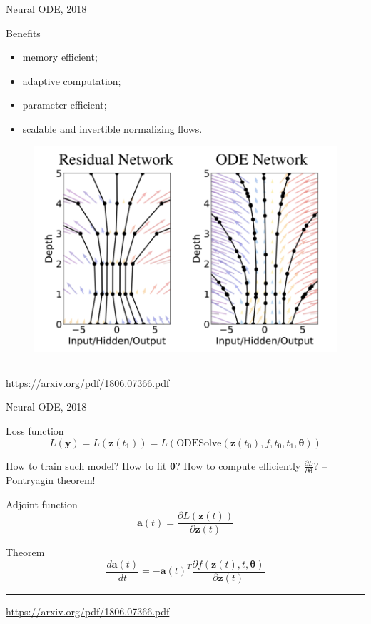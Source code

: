 \documentclass{beamer}
\newcommand{\ba}{\mathbf{a}}
\newcommand{\bz}{\mathbf{z}}
\newcommand{\by}{\mathbf{y}}
\newcommand{\btheta}{\boldsymbol{\theta}}
\begin{document}
\begin{frame}{Neural ODE, 2018}

\vspace{-0.2cm}
\begin{block}{Benefits}
\begin{itemize}
    \item memory efficient;
    \item adaptive computation;
    \item parameter efficient;
    \item scalable and invertible normalizing flows.
\end{itemize}
\end{block}
\begin{figure}
    \centering
    \includegraphics[width=0.55\linewidth]{figs/resnet_vs_neural_ode.png}
\end{figure}
 \vfill
\hrule\medskip
{\scriptsize \href{https://arxiv.org/pdf/1806.07366.pdf}{https://arxiv.org/pdf/1806.07366.pdf}}   
\end{frame}
\begin{frame}{Neural ODE, 2018}
\begin{block}{Loss function}
\vspace{-0.2cm}
\[
    L(\by) = L(\bz(t_1)) = L\left(\text{ODESolve}(\bz(t_0), f, t_0,t_1, \btheta) \right)
\]
\vspace{-0.2cm}
\end{block}
How to train such model? How to fit $\btheta$? How to compute efficiently $\frac{\partial L}{\partial \btheta}$? -- Pontryagin theorem!
\begin{block}{Adjoint function}
\vspace{-0.2cm}
\[
    \ba(t) = \frac{\partial L(\bz(t))}{\partial \bz(t)}
\]
\vspace{-0.2cm}
\end{block}
\begin{block}{Theorem}
\vspace{-0.2cm}
\[
    \frac{d \ba(t)}{dt} = - \ba(t)^T \frac{\partial f(\bz(t), t, \btheta)}{\partial \bz(t)}
\]
\end{block}
 \vfill
\hrule\medskip
{\scriptsize \href{https://arxiv.org/pdf/1806.07366.pdf}{https://arxiv.org/pdf/1806.07366.pdf}}   
\end{frame}
\end{document}
